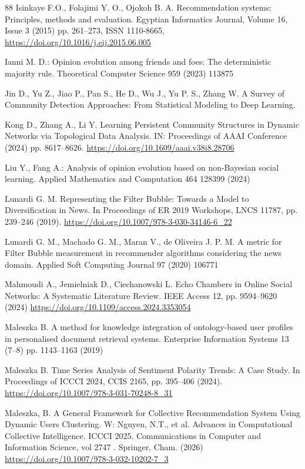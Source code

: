 \begin{thebibliography}{88}
Isinkaye F.O., Folajimi Y. O., Ojokoh B. A. Recommendation systems: Principles, methods and evaluation. Egyptian Informatics Journal,
Volume 16, Issue 3 (2015) pp. 261--273, ISSN 1110-8665, \url{https://doi.org/10.1016/j.eij.2015.06.005}

 Ianni M. D.: Opinion evolution among friends and foes: The deterministic majority rule. Theoretical Computer Science 959 (2023) 113875

Jin D., Yu Z., Jiao P., Pan S., He D., Wu J., Yu P. S., Zhang W. A Survey of Community Detection Approaches: From Statistical Modeling to Deep Learning. 

Kong D., Zhang A., Li Y. Learning Persistent Community Structures in Dynamic Networks via Topological Data Analysis. IN: Proceedings of AAAI Conference (2024) pp. 8617--8626. \url{https://doi.org/10.1609/aaai.v38i8.28706}

 Liu Y., Fang A.: Analysis of opinion evolution based on non-Bayesian social learning. Applied Mathematics and Computation 464 128399 (2024)

Lunardi G. M. Representing the Filter Bubble: Towards a Model to Diversification in News. In Proceedings of ER 2019 Workshops, LNCS 11787, pp. 239--246 (2019). \url{https://doi.org/10.1007/978-3-030-34146-6_22}

Lunardi G. M., Machado G. M., Maran V., de Oliveira J. P. M. A metric for Filter Bubble measurement in recommender algorithms
considering the news domain. Applied Soft Computing Journal 97 (2020) 106771

Mahmoudi A., Jemielniak D., Ciechanowski L. Echo Chambers in Online Social Networks: A Systematic Literature Review.  IEEE Access 12, pp. 9594--9620 (2024) \url{https://doi.org/10.1109/access.2024.3353054}

Maleszka B. A method for knowledge integration of ontology-based user profiles in personalised document retrieval systems. Enterprise Information Systems 13 (7--8) pp. 1143--1163 (2019)

Maleszka B. Time Series Analysis of Sentiment Polarity Trends: A Case Study. In Proceedings of ICCCI 2024, CCIS 2165, pp. 395--406 (2024). \url{https://doi.org/10.1007/978-3-031-70248-8_31}

Maleszka, B. A General Framework for Collective Recommendation System Using Dynamic Users Clustering. W: Nguyen, N.T., et al. Advances in Computational Collective Intelligence. ICCCI 2025. Communications in Computer and Information Science, vol 2747 . Springer, Cham. (2026) \url{https://doi.org/10.1007/978-3-032-10202-7_3}




\end{thebibliography}
